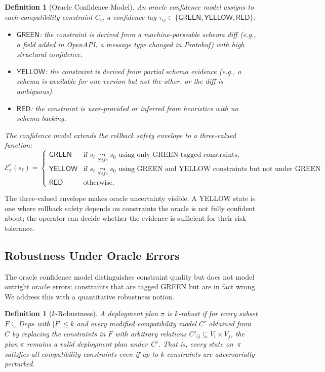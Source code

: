 \documentclass[10pt,twocolumn]{article}
\newtheorem{definition}[theorem]{Definition}
\begin{document}
\begin{definition}[Oracle Confidence Model]
\label{def:oracle}
An \emph{oracle confidence model} assigns to each compatibility constraint
$C_{ij}$ a confidence tag $\tau_{ij} \in
\{\mathsf{GREEN}, \mathsf{YELLOW}, \mathsf{RED}\}$:
\begin{itemize}
\item $\mathsf{GREEN}$: the constraint is derived from a
  machine-parseable schema diff (e.g., a field added in OpenAPI, a message
  type changed in Protobuf) with high structural confidence.
\item $\mathsf{YELLOW}$: the constraint is derived from partial schema
  evidence (e.g., a schema is available for one version but not the other,
  or the diff is ambiguous).
\item $\mathsf{RED}$: the constraint is user-provided or inferred from
  heuristics with no schema backing.
\end{itemize}
The confidence model extends the rollback safety envelope to a
three-valued function:
\[
  \mathcal{E}_\pi^{\tau}(s_\ell) =
  \begin{cases}
    \mathsf{GREEN}  & \text{if } s_\ell
      \underset{\mathit{Safe}}{\leadsto} s_0
      \text{ using only GREEN-tagged constraints,}\\
    \mathsf{YELLOW} & \text{if } s_\ell
      \underset{\mathit{Safe}}{\leadsto} s_0
      \text{ using GREEN and YELLOW constraints but not under GREEN alone,}\\
    \mathsf{RED}    & \text{otherwise.}
  \end{cases}
\]
\end{definition}

\noindent
The three-valued envelope makes oracle uncertainty visible.  A YELLOW state
is one where rollback safety depends on constraints the oracle is not fully
confident about; the operator can decide whether the evidence is sufficient
for their risk tolerance.

\subsection{Robustness Under Oracle Errors}
\label{sec:formal:robust}

The oracle confidence model distinguishes constraint quality but does not
model outright oracle errors: constraints that are tagged GREEN but are
in fact wrong.  We address this with a quantitative robustness notion.

\begin{definition}[$k$-Robustness]
\label{def:krobust}
A deployment plan $\pi$ is \emph{$k$-robust} if for every subset
$F \subseteq \mathit{Deps}$ with $|F| \leq k$ and every modified
compatibility model $C'$ obtained from~$C$ by replacing the constraints in
$F$ with arbitrary relations $C'_{ij} \subseteq V_i \times V_j$, the plan
$\pi$ remains a valid deployment plan under~$C'$.  That is, every state
on~$\pi$ satisfies all compatibility constraints even if up to $k$
constraints are adversarially perturbed.
\end{definition}
\end{document}
